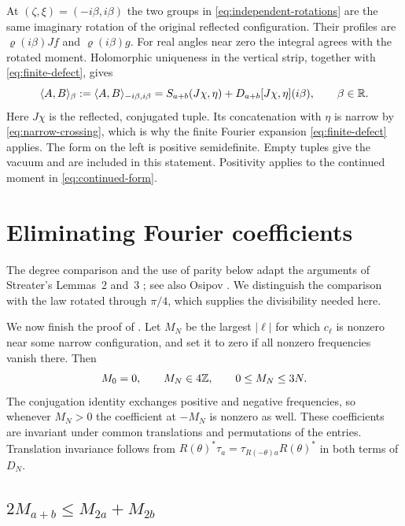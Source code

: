At $(\zeta,\xi)=(-i\beta,i\beta)$ the two groups in
\eqref{eq:independent-rotations} are the same imaginary rotation of
the original reflected configuration. Their profiles are
$\varrho(i\beta)Jf$ and $\varrho(i\beta)g$. For real angles near zero
the integral agrees with the rotated moment. Holomorphic uniqueness
in the vertical strip, together with \eqref{eq:finite-defect}, gives
\begin{equation}\label{eq:continued-form}
 \langle A,B\rangle_\beta
 :=\langle A,B\rangle_{-i\beta,i\beta}
 =S_{a+b}(J\chi,\eta)+D_{a+b}[J\chi,\eta](i\beta),
 \qquad\beta\in\mathbb{R}.
\end{equation}
Here $J\chi$ is the reflected, conjugated tuple. Its concatenation
with $\eta$ is narrow by \eqref{eq:narrow-crossing}, which is why
the finite Fourier expansion \eqref{eq:finite-defect} applies.
The form on the left is positive semidefinite. Empty tuples give
the vacuum and are included in this statement. Positivity applies
to the continued moment in \eqref{eq:continued-form}.

\section{Eliminating Fourier coefficients}\label{sec:eliminating}

The degree comparison and the use of parity below adapt the arguments
of Streater's Lemmas~2 and~3 \cite[pp.~113--114]{Streater}; see also
Osipov \cite[p.~115]{O}. We distinguish the comparison with the law
rotated through $\pi/4$, which supplies the divisibility needed here.

We now finish the proof of . Let $M_N$ be the largest
$|\ell|$ for which $c_\ell$ is nonzero near some narrow configuration,
and set it to zero if all nonzero frequencies vanish there. Then
\begin{equation}\label{eq:M-bound}
 M_0=0,\qquad M_N\in4\mathbb{Z},\qquad0\leq M_N\leq3N.
\end{equation}
The conjugation identity exchanges positive and negative frequencies,
so whenever $M_N>0$ the coefficient at $-M_N$ is nonzero as well.
These coefficients are invariant under common translations and
permutations of the entries. Translation invariance follows from
$R(\theta)^*\tau_a=\tau_{R(-\theta)a}R(\theta)^*$ in both terms
of $D_N$.

\subsection{$2M_{a+b}\leq M_{2a}+M_{2b}$}

